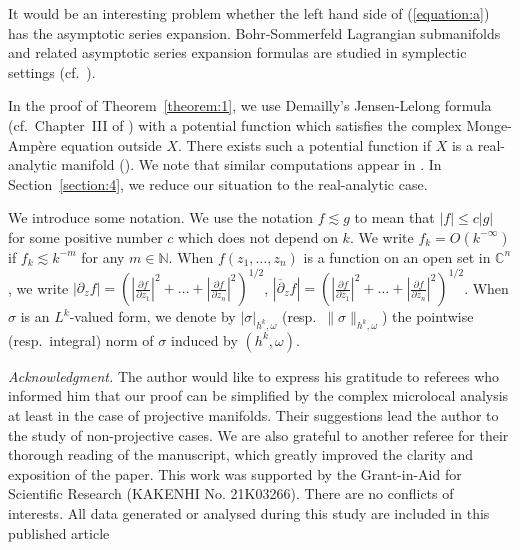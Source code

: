 \documentclass[12pt,oneside]{amsart}
\theoremstyle{plain}
\theoremstyle{definition}
\theoremstyle{remark}
\begin{document}
It would be an interesting problem whether the left hand side of (\ref{equation:a}) has the asymptotic series expansion.  
Bohr-Sommerfeld Lagrangian submanifolds and related asymptotic series expansion formulas are studied in symplectic settings (cf.~\cite{Ioo}).  
 
 In the proof of Theorem~\ref{theorem:1}, we use Demailly's Jensen-Lelong formula (cf.~Chapter~III of \cite{Dem}) with a potential function which satisfies the complex Monge-Amp\`ere equation outside $X$.  
There exists such a potential function if $X$ is a real-analytic manifold (\cite{Gui-Ste}).  
We note that similar computations appear in \cite{Ber-Ort}.  
In Section~\ref{section:4}, we reduce our situation to the real-analytic case. 

We introduce some notation.  
We use the notation $f \lesssim g$ to mean that $|f| \leq c |g|$ for some positive number $c$ which does not depend on $k$.  
We write $f_{k} = O(k^{-\infty})$ if $f_{k} \lesssim k^{-m}$ for any $m \in \mathbb{N}$.  
When $f(z_{1}, \ldots, z_{n})$ is a function on an open set in $\mathbb{C}^n$, 
we write $|\partial_{z} f| = (|\frac{\partial f}{\partial z_{1}}|^2 + \ldots + |\frac{\partial f}{\partial z_{n}}|^2)^{1/2}$, $|\overline{\partial}_{z} f| = (|\frac{\partial f}{\partial \overline{z}_{1}}|^2 + \ldots + |\frac{\partial f}{\partial \overline{z}_{n}}|^2)^{1/2}$.  
When $\sigma$ is an $L^k$-valued form, we denote by $|\sigma|_{h^k, \omega}$ (resp.~$\|\sigma\|_{h^k, \omega}$) the pointwise (resp.~integral) norm of $\sigma$ induced by $(h^k, \omega)$.  

\medskip 

{\it Acknowledgment.}
The author would like to express his gratitude to referees who informed him that our proof can be simplified by the complex microlocal analysis at least in the case of projective manifolds.  
Their suggestions lead the author to the study of non-projective cases.  
We are also grateful to another referee for their thorough reading of the manuscript, 
which greatly improved the clarity and exposition of the paper.
This work was supported by the 
Grant-in-Aid for Scientific Research (KAKENHI No.\! 21K03266).  
There are no conflicts of interests.  
All data generated or analysed during this study are included in this published article
\end{document}
